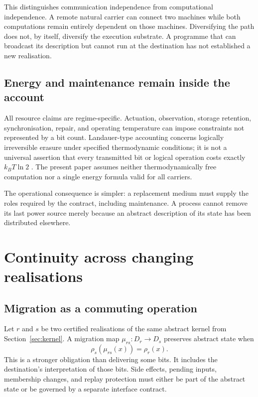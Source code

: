 \documentclass[11pt,a4paper]{article}
\theoremstyle{definition}
\theoremstyle{remark}
\begin{document}
This distinguishes communication independence from computational independence. A remote natural carrier can connect two machines while both computations remain entirely dependent on those machines. Diversifying the path does not, by itself, diversify the execution substrate. A programme that can broadcast its description but cannot run at the destination has not established a new realisation.

\subsection{Energy and maintenance remain inside the account}
All resource claims are regime-specific. Actuation, observation, storage retention, synchronisation, repair, and operating temperature can impose constraints not represented by a bit count. Landauer-type accounting concerns logically irreversible erasure under specified thermodynamic conditions; it is not a universal assertion that every transmitted bit or logical operation costs exactly $k_BT\ln2$ \citep{bennett}. The present paper assumes neither thermodynamically free computation nor a single energy formula valid for all carriers.

The operational consequence is simpler: a replacement medium must supply the roles required by the contract, including maintenance. A process cannot remove its last power source merely because an abstract description of its state has been distributed elsewhere.

\section{Continuity across changing realisations}\label{sec:continuity}
\subsection{Migration as a commuting operation}
Let $r$ and $s$ be two certified realisations of the same abstract kernel from Section~\ref{sec:kernel}. A migration map $\mu_{rs}:D_r\to D_s$ preserves abstract state when
\begin{equation}\label{eq:migration}
 \rho_s(\mu_{rs}(x))=\rho_r(x).
\end{equation}
This is a stronger obligation than delivering some bits. It includes the destination's interpretation of those bits. Side effects, pending inputs, membership changes, and replay protection must either be part of the abstract state or be governed by a separate interface contract.
\end{document}
